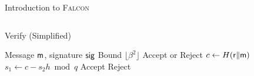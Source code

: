 \begin{frame}{Introduction to \textsc{Falcon}}
\begin{columns}[T]
\begin{block}{{\large Verify (Simplified)}}
\begin{algorithm}[H]
  \label{alg:falcon-verify}
  \begin{algorithmic}[1]
    \REQUIRE Message ${\sf m}$, signature ${\sf sig}$
    \REQUIRE Bound $\lfloor \beta^2 \rfloor$
    \ENSURE Accept or Reject
    \STATE $c \gets H({\sf r} \| {\sf m})$
    \STATE $s_1 \gets c - s_2 h \bmod q$
        \STATE Accept
    \ELSE
        \STATE Reject
    \ENDIF
  \end{algorithmic}
\end{algorithm}

\end{block}
\end{columns}
    
\end{frame}

\fi
%
%
%
